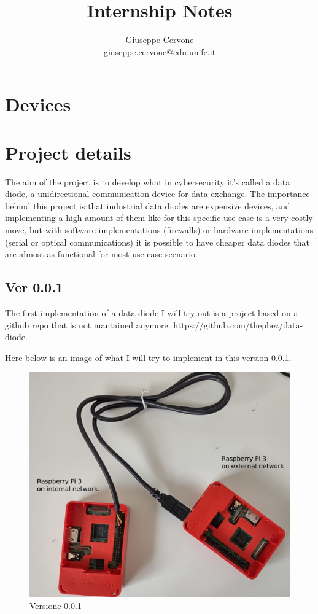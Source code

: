 \documentclass[a4paper,11pt]{scrartcl}
\title{Internship Notes}
\date{}
\author{Giuseppe Cervone\\ \url{giuseppe.cervone@edu.unife.it}}
\begin{document}
\maketitle

\section{Devices}

\section{Project details}
The aim of the project is to develop what in cybersecurity it's called a data diode, a unidirectional communication device for data exchange. 
The importance behind this project is that industrial data diodes are expensive devices, and implementing a high amount of them like for this specific use case is a very costly move, but with software implementations (firewalls) or hardware implementations (serial or optical communications) it is possible to have cheaper data diodes that are almost as functional for most use case scenario.
\subsection{Ver 0.0.1}
The first implementation of a data diode I will try out is a project based on a github repo that is not mantained anymore. https://github.com/thephez/data-diode.

Here below is an image of what I will try to implement in this version 0.0.1.
\begin{figure}[htbp]
\centerline{\includegraphics{0.0.1.png}}
\caption{Versione 0.0.1}
\label{fig}
\end{figure}
\end{document}
